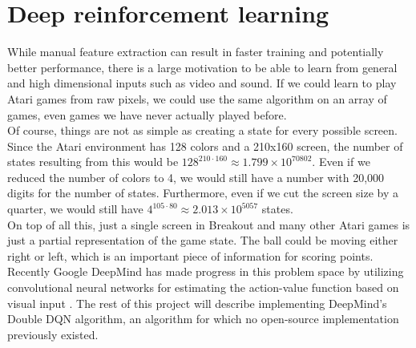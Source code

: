 \documentclass{article}
\begin{document}
\section{Deep reinforcement learning}
  While manual feature extraction can result in faster training and potentially better performance, there is a large motivation to be able to learn from general and high dimensional inputs such as video and sound. If we could learn to play Atari games from raw pixels, we could use the same algorithm on an array of games, even games we have never actually played before. \\

  Of course, things are not as simple as creating a state for every possible screen. Since the Atari environment has 128 colors and a 210x160 screen, the number of states resulting from this would be $128^{210 \cdot 160} \approx 1.799\times 10^{70802}$. Even if we reduced the number of colors to 4, we would still have a number with 20,000 digits for the number of states. Furthermore, even if we cut the screen size by a quarter, we would still have $4^{105 \cdot 80} \approx 2.013\times 10^{5057}$ states. \\

  On top of all this, just a single screen in Breakout and many other Atari games is just a partial representation of the game state. The ball could be moving either right or left, which is an important piece of information for scoring points. \\

  Recently Google DeepMind has made progress in this problem space by utilizing convolutional neural networks for estimating the action-value function based on visual input \cite{dmnips}. The rest of this project will describe implementing DeepMind's Double DQN algorithm, an algorithm for which no open-source implementation previously existed.
\end{document}
